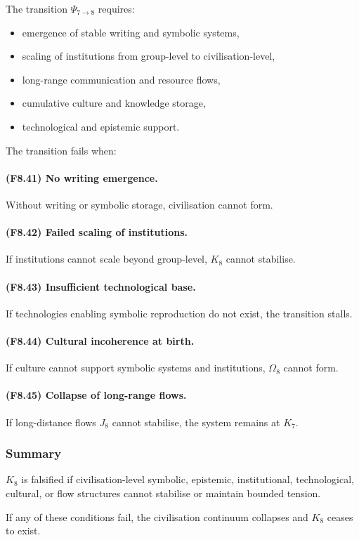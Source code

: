 The transition $\Psi_{7\to 8}$ requires:

\begin{itemize}
    \item emergence of stable writing and symbolic systems,
    \item scaling of institutions from group-level to civilisation-level,
    \item long-range communication and resource flows,
    \item cumulative culture and knowledge storage,
    \item technological and epistemic support.
\end{itemize}

The transition fails when:

\paragraph{(F8.41) No writing emergence.}
Without writing or symbolic storage,
civilisation cannot form.

\paragraph{(F8.42) Failed scaling of institutions.}
If institutions cannot scale beyond group-level,
$K_8$ cannot stabilise.

\paragraph{(F8.43) Insufficient technological base.}
If technologies enabling symbolic reproduction do not exist,
the transition stalls.

\paragraph{(F8.44) Cultural incoherence at birth.}
If culture cannot support symbolic systems and institutions,
$\Omega_8$ cannot form.

\paragraph{(F8.45) Collapse of long-range flows.}
If long-distance flows $J_8$ cannot stabilise,
the system remains at $K_7$.



\subsubsection{Summary}

$K_8$ is falsified if civilisation-level symbolic, epistemic,
institutional, technological, cultural, or flow structures
cannot stabilise or maintain bounded tension.

If any of these conditions fail,
the civilisation continuum collapses and $K_8$ ceases to exist.
